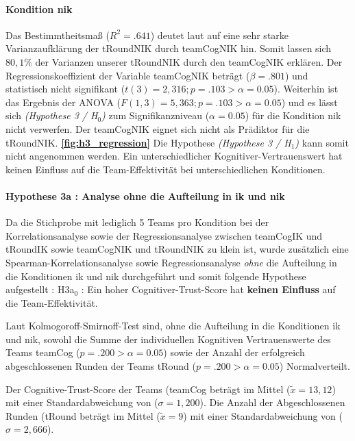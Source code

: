 \documentclass[a4paper,11pt]{article}%
\renewcommand{\\}{\vspace*{0.5\baselineskip} \newline}
\begin{document}
\paragraph{Kondition \ac{nik}}
Das Bestimmtheitsmaß ($R^{2} = .641$) deutet laut \citep{cohen2013statistical} auf eine sehr starke Varianzaufklärung der \ac{tRoundNIK} durch \ac{teamCogNIK} hin. Somit lassen sich $80,1\%$ der Varianzen unserer \ac{tRoundNIK} durch den \ac{teamCogNIK} erklären. \\
Der Regressionskoeffizient der Variable \ac{teamCogNIK} beträgt ($\beta = .801$) und statistisch nicht signifikant ($t(3) = 2,316; p = .103 > \alpha = 0.05$). \\
Weiterhin ist das Ergebnis der ANOVA ($F(1,3) = 5,363; p = .103 > \alpha = 0.05$) und es lässt sich \textit{(Hypothese 3 / H$_{0}$)} zum Signifikanzniveau ($\alpha = 0.05$) für die Kondition \ac{nik} nicht verwerfen. \\
Der \ac{teamCogNIK} eignet sich nicht als Prädiktor für die \ac{tRoundNIK}.
\textbf{\autoref{fig:h3_regression}}\\
Die Hypothese \textit{(Hypothese 3 / H$_{1}$)} kann somit nicht angenommen werden. Ein unterschiedlicher Kognitiver-Vertrauenswert hat keinen Einfluss auf die Team-Effektivität bei unterschiedlichen Konditionen.

\paragraph{Hypothese 3a : Analyse ohne die Aufteilung in \ac{ik} und \ac{nik} }
Da die Stichprobe mit lediglich 5 Teams pro Kondition bei der Korrelationsanalyse sowie der Regressionsanalyse zwischen \ac{teamCogIK} und \ac{tRoundIK} sowie \ac{teamCogNIK} und \ac{tRoundNIK} zu klein ist, wurde zusätzlich eine Spearman-Korrelationsanalyse sowie Regressionsanalyse \textit{ohne} die Aufteilung in die Konditionen \ac{ik} und \ac{nik} durchgeführt und somit folgende Hypothese aufgestellt :\\
H3a$_{0}$ : Ein hoher Cognitiver-Trust-Score hat \textbf{keinen Einfluss} auf die Team-Effektivität.

Laut Kolmogoroff-Smirnoff-Test sind, ohne die Aufteilung in die Konditionen \ac{ik} und \ac{nik}, sowohl die Summe der individuellen Kognitiven Vertrauenswerte des Teams \ac{teamCog} ($p = .200 > \alpha = 0.05$) sowie der Anzahl der erfolgreich abgeschlossenen Runden der Teams \ac{tRound} ($p = .200 > \alpha = 0.05$) Normalverteilt.

Der Cognitive-Trust-Score der Teams (\ac{teamCog} beträgt im Mittel ($\tilde x = 13,12$) mit einer Standardabweichung von ($\sigma = 1,200$).
Die Anzahl der Abgeschlossenen Runden (\ac{tRound} beträgt im Mittel ($\tilde x = 9$) mit einer Standardabweichung von ($\sigma = 2,666$). 
\end{document}
